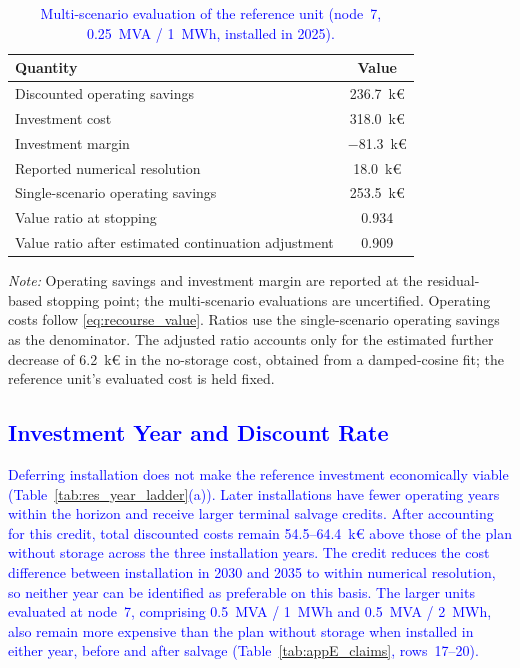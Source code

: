 \documentclass[preprint,12pt]{elsarticle}
\begin{document}
\begin{table}[htbp!]
    \centering
    \caption{\textcolor{blue}{Multi-scenario evaluation of the reference unit (node~7, 0.25~MVA / 1~MWh, installed in 2025).}}
    \label{tab:res_multiscenario}
    \footnotesize\setlength{\tabcolsep}{5pt}
    \begin{tabular}{l c}
        \toprule
        Quantity & Value \\
        \midrule
        Discounted operating savings & 236.7~k\euro{} \\
        Investment cost & 318.0~k\euro{} \\
        Investment margin & $-$81.3~k\euro{} \\
        Reported numerical resolution & 18.0~k\euro{} \\
        Single-scenario operating savings & 253.5~k\euro{} \\
        Value ratio at stopping & 0.934 \\
        Value ratio after estimated continuation adjustment & 0.909 \\
        \bottomrule
    \end{tabular}
    \par\smallskip
    \begin{minipage}{\linewidth}
        \footnotesize\raggedright
        \textit{Note:}
        Operating savings and investment margin are reported at the residual-based stopping point; the multi-scenario evaluations are uncertified.
        Operating costs follow \eqref{eq:recourse_value}.
        Ratios use the single-scenario operating savings as the denominator.
        The adjusted ratio accounts only for the estimated further decrease of 6.2~k\euro{} in the no-storage cost, obtained from a damped-cosine fit; the reference unit's evaluated cost is held fixed.
    \end{minipage}
\end{table}

\subsection{\textcolor{blue}{Investment Year and Discount Rate}}
\label{subsec:res_sensitivities}

\textcolor{blue}{
    Deferring installation does not make the reference investment economically viable (Table~\ref{tab:res_year_ladder}(a)). Later installations have fewer operating years within the horizon and receive larger terminal salvage credits. After accounting for this credit, total discounted costs remain 54.5--64.4~k\euro{} above those of the plan without storage across the three installation years. The credit reduces the cost difference between installation in 2030 and 2035 to within numerical resolution, so neither year can be identified as preferable on this basis. The larger units evaluated at node~7, comprising 0.5~MVA / 1~MWh and 0.5~MVA / 2~MWh, also remain more expensive than the plan without storage when installed in either year, before and after salvage (Table~\ref{tab:appE_claims}, rows~17--20).
}
\end{document}
